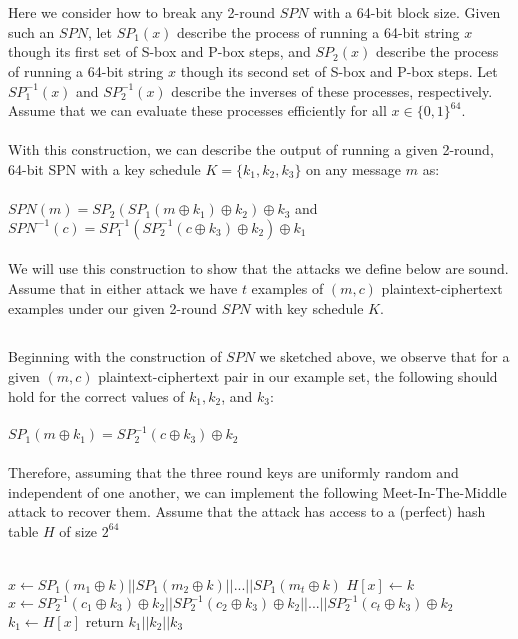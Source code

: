 \documentclass[]{article}
\begin{document}
\section{}
Here we consider how to break any 2-round $SPN$ with a 64-bit block size. Given such an $SPN$, let $SP_1(x)$ describe the process of running a 64-bit string $x$ though its first set of S-box and P-box steps, and $SP_2(x)$ describe the process of running a 64-bit string $x$ though its second set of S-box and P-box steps. Let $SP_1^{-1}(x)$ and  $SP_2^{-1}(x)$ describe the inverses of these processes, respectively. Assume that we can evaluate these processes efficiently for all $x \in \{0,1\}^{64}$.
\\\\
With this construction, we can describe the output of running a given 2-round, 64-bit SPN with a key schedule $K = \{k_1, k_2, k_3\}$ on any message $m$ as:
\\\\
$SPN(m) = SP_2(SP_1(m \oplus k_1) \oplus k_2) \oplus k_3$ and $SPN^{-1}(c) = SP_1^{-1}(SP_2^{-1}(c \oplus k_3) \oplus k_2) \oplus k_1$
\\\\
We will use this construction to show that the attacks we define below are sound. Assume that in either attack we have $t$ examples of $(m, c)$ plaintext-ciphertext examples under our given 2-round $SPN$ with key schedule $K$.
\subsection{}
Beginning with the construction of $SPN$ we sketched above, we observe that for a given $(m, c)$ plaintext-ciphertext pair in our example set, the following should hold for the correct values of $k_1, k_2$, and $k_3$:
\\\\
$SP_1(m \oplus k_1) = SP_2^{-1}(c \oplus k_3) \oplus k_2$
\\\\
Therefore, assuming that the three round keys are uniformly random and independent of one another, we can implement the following Meet-In-The-Middle attack to recover them. Assume that the attack has access to a (perfect) hash table $H$ of size $2^{64}$
\\\\
\begin{algorithm}[H]
	\SetAlgoLined
	 {
		$x \leftarrow SP_1(m_1 \oplus k)  || SP_1(m_2 \oplus k)  || ... || SP_1(m_t \oplus k)$\;
		$H[x] \leftarrow k$\;
	}
	 {
		$x \leftarrow SP_2^{-1}(c_1 \oplus k_3) \oplus k_2 || SP_2^{-1}(c_2 \oplus k_3) \oplus k_2  || ... || SP_2^{-1}(c_t \oplus k_3) \oplus k_2 $\;
		 {
			$k_1 \leftarrow H[x]$\;
			return $k_1 || k_2 || k_3$\;
		}
	}
	\caption{$Attack((m_1,c_1),(m_2, c_2), ..., (m_t, c_t))$}
\end{algorithm}
\end{document}
